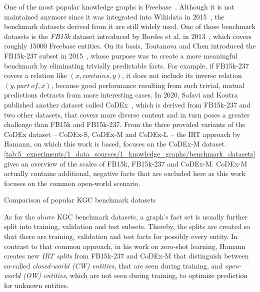 One of the most popular knowledge graphs is Freebase~\cite{}. Although it is not maintained anymore since it was integrated into Wikidata in 2015~\cite{Tanon2016FromFT}, the benchmark datasets derived from it are still widely used. One of those benchmark datasets is the \emph{FB15k} dataset introduced by Bordes et al. in 2013~\cite{Bordes2013TranslatingEF}, which covers roughly \num{15000} Freebase entities. On its basis, Toutanova and Chen introduced the FB15k-237 subset in 2015~\cite{Toutanova2015ObservedVL}, whose purpose was to create a more meaningful benchmark by eliminating trivially predictable facts. For example, if FB15k-237 covers a relation like $(x, contains, y)$, it does not include its inverse relation $(y, part~of, x)$, because good performance resulting from such trivial, mutual predictions detracts from more interesting cases. In 2020, Safavi and Koutra published another dataset called CoDEx~\cite{Safavi2020CoDExAC}, which is derived from FB15k-237 and two other datasets, that covers more diverse content and in turn poses a greater challenge than FB15k and FB15k-237. From the three provided variants of the CoDEx dataset -- CoDEx-S, CoDEx-M and CoDEx-L -- the IRT approach by Hamann, on which this work is based, focuses on the CoDEx-M dataset. \autoref{tab:5_experiments/1_data_sources/1_knowledge_graphs/benchmark_datasets} gives an overview of the scales of FB15k, FB15k-237 and CoDEx-M. CoDEx-M actually contains additional, negative facts that are excluded here as this work focuses on the common open-world scenario.

\begin{table}[h]
    \centering
    
    \caption{Comparison of popular KGC benchmark datasets}
    \label{tab:5_experiments/1_data_sources/1_knowledge_graphs/benchmark_datasets}
\end{table}

As for the above KGC benchmark datasets, a graph's fact set is usually further split into training, validation and test subsets. Thereby, the splits are created so that there are training, validation and test facts for possibly every entity. In contrast to that common approach, in his work on zero-shot learning, Hamann creates new \emph{IRT splits} from FB15k-237 and CoDEx-M that distinguish between so-called \emph{closed-world (CW) entities}, that are seen during training, and \emph{open-world (OW) entities}, which are not seen during training, to optimize prediction for unknown entities.

